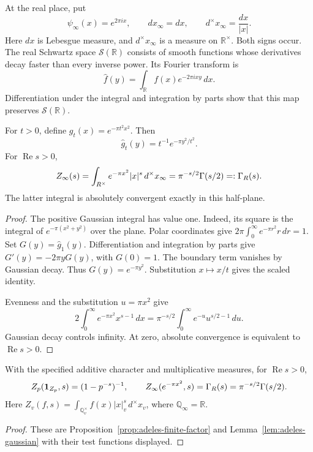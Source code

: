 At the real place, put
\[
 \psi_\infty(x)=e^{2\pi ix},\qquad dx_\infty=dx,
 \qquad d^{\times} x_\infty=\frac{dx}{|x|}.
\]
Here \(dx\) is Lebesgue measure, and \(d^{\times} x_\infty\) is a measure on
\(\mathbb R^\times\). Both signs occur. The real Schwartz space
\(\mathcal S(\mathbb R)\) consists of smooth functions whose derivatives
decay faster than every inverse power. Its Fourier transform is
\[
 \widehat f(y)=\int_{\mathbb R}f(x)e^{-2\pi ixy}\,dx.
\]
Differentiation under the integral and integration by parts show that this
map preserves \(\mathcal S(\mathbb R)\).

\begin{lemma}
\label{lem:adeles-gaussian}
For \(t>0\), define \(g_t(x)=e^{-\pi t^2x^2}\). Then
\[
 \widehat g_t(y)=t^{-1}e^{-\pi y^2/t^2}.
\]
For \(\operatorname{Re}s>0\),
\[
 Z_\infty(s)=\int_{R^\times}e^{-\pi x^2}|x|^s\,d^{\times} x_\infty
 =\pi^{-s/2}\Gamma(s/2)=:\Gamma_{R}(s).
\]
The latter integral is absolutely convergent exactly in this half-plane.
\end{lemma}

\begin{proof}
The positive Gaussian integral has value one. Indeed, its square is the
integral of \(e^{-\pi(x^2+y^2)}\) over the plane. Polar coordinates give
\(2\pi\int_0^\infty e^{-\pi r^2}r\,dr=1\).
Set \(G(y)=\widehat g_1(y)\). Differentiation and integration by parts give
\(G'(y)=-2\pi yG(y)\), with \(G(0)=1\).
The boundary term vanishes by Gaussian decay. Thus
\(G(y)=e^{-\pi y^2}\). Substitution \(x\mapsto x/t\) gives the scaled
identity.

Evenness and the substitution \(u=\pi x^2\) give
\[
 2\int_0^\infty e^{-\pi x^2}x^{s-1}\,dx
 =\pi^{-s/2}\int_0^\infty e^{-u}u^{s/2-1}\,du.
\]
Gaussian decay controls infinity. At zero, absolute convergence is
equivalent to \(\operatorname{Re}s>0\).
\end{proof}

\begin{proposition}
\label{prop:adeles-local-factors}
\label{prop:local-tate}
With the specified additive character and multiplicative measures, for
\(\operatorname{Re}s>0\),
\[
 Z_p(\mathbf 1_{Z_p},s)=(1-p^{-s})^{-1},\qquad
 Z_\infty(e^{-\pi x^2},s)=\Gamma_{R}(s)=\pi^{-s/2}\Gamma(s/2).
\]
Here \(Z_v(f,s)=\int_{\mathbb Q_v^\times}f(x)|x|_v^s\,d^{\times} x_v\),
where \(\mathbb Q_\infty=\mathbb R\).
\end{proposition}

\begin{proof}
These are Proposition~\ref{prop:adeles-finite-factor} and
Lemma~\ref{lem:adeles-gaussian} with their test functions displayed.
\end{proof}


